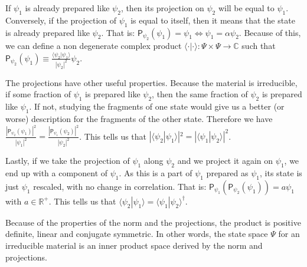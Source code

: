 \documentclass[smallextended]{svjour3}
\numberwithin{equation}{section}
\begin{document}
If $\psi_1$ is already prepared like $\psi_2$, then its projection on $\psi_2$ will be equal to $\psi_1$. Conversely, if the projection of $\psi_1$ is equal to itself, then it means that the state is already prepared like $\psi_2$. That is: $\mathsf{P}_{\psi_2} (\psi_1) = \psi_1 \Leftrightarrow \psi_1 = \alpha \psi_2$. Because of this, we can define a non degenerate complex product $\langle \cdot |\cdot \rangle : \Psi \times \Psi \rightarrow \mathbb{C}$ such that $\mathsf{P}_{\psi_2} (\psi_1) \equiv \frac{\langle \psi_2|\psi_1 \rangle}{|\psi_2|^2} \psi_2$.

The projections have other useful properties. Because the material is irreducible, if some fraction of $\psi_1$ is prepared like $\psi_2$, then the same fraction of $\psi_2$ is prepared like $\psi_1$. If not, studying the fragments of one state would give us a better (or worse) description for the fragments of the other state. Therefore we have $\frac{|\mathsf{P}_{\psi_2} (\psi_1)|^2}{|\psi_1|^2}=\frac{|\mathsf{P}_{\psi_1} (\psi_2)|^2}{|\psi_2|^2}$. This tells us that $|\langle \psi_2|\psi_1 \rangle|^2 = |\langle \psi_1|\psi_2 \rangle|^2$.

Lastly, if we take the projection of $\psi_1$ along $\psi_2$ and we project it again on $\psi_1$, we end up with a component of $\psi_1$. As this is a part of $\psi_1$ prepared as $\psi_1$, its state is just $\psi_1$ rescaled, with no change in correlation. That is: $\mathsf{P}_{\psi_1} (\mathsf{P}_{\psi_2} (\psi_1)) = a \psi_1$ with $a \in \mathbb{R}^+$. This tells us that $\langle \psi_2|\psi_1 \rangle = \langle \psi_1|\psi_2 \rangle^\dagger$.

Because of the properties of the norm and the projections, the product is positive definite, linear and conjugate symmetric. In other words, the state space $\Psi$ for an irreducible material is an inner product space derived by the norm and projections.
 
\end{document}
